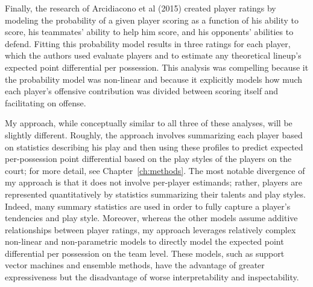 Finally, the research of Arcidiacono et al (2015) created player ratings by modeling
the probability of a given player scoring as a function of his ability to score, his
teammates' ability to help him score, and his opponents' abilities to defend.
Fitting this probability model results in three ratings for each player, which the
authors used evaluate players and to estimate any theoretical lineup's expected
point differential per possession. This analysis was compelling because it the
probability model was non-linear and because it explicitly models how much each
player's offensive contribution was divided between scoring itself and facilitating
on offense.

My approach, while conceptually similar to all three of these analyses, will be
slightly different. Roughly, the approach involves summarizing each player based on
statistics describing his play and then using these profiles to predict expected
per-possession point differential based on the play styles of the players on the
court; for more detail, see Chapter~\ref{ch:methods}. The most notable divergence of
my approach is that it does not involve per-player estimands; rather, players are
represented quantitatively by statistics summarizing their talents and play styles.
Indeed, many summary statistics are used in order to fully capture a player's
tendencies and play style. Moreover, whereas the other models assume additive
relationships between player ratings, my approach leverages relatively complex
non-linear and non-parametric models to directly model the expected point
differential per possession on the team level. These models, such as support vector
machines and ensemble methods, have the advantage of greater expressiveness but the
disadvantage of worse interpretability and inspectability.
